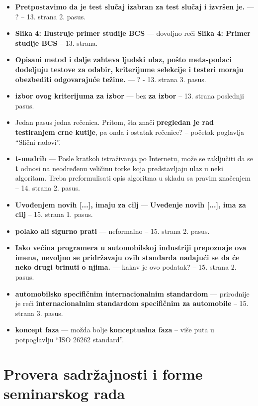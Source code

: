 \documentclass[a4paper]{report}
\begin{document}
\begin{itemize}
\item {\bf{Pretpostavimo da je test slučaj izabran za test slučaj i izvršen je.}} --- ? -- 13. strana 2. pasus.
\item {\bf{Slika 4: Ilustruje primer studije BCS}} --- dovoljno reći {\bf{Slika 4: Primer studije BCS}} -- 13. strana.
\item {\bf{Opisani metod i dalje zahteva ljudski ulaz, pošto meta-podaci dodeljuju testove za odabir, kriterijume selekcije i testeri moraju obezbediti odgovarajuće težine.}} --- ? - 13. strana 3. pasus.
\item {\bf{izbor ovog kriterijuma za izbor}} --- bez {\bf{za izbor}} -- 13. strana poslednji pasus.
\item Jedan pasus jedna rečenica. Pritom, šta znači {\bf{pregledan je rad testiranjem crne kutije}}, pa onda i ostatak rečenice? -- početak poglavlja ``Slični radovi''.
\item {\bf{t-mudrih}} --- Posle kratkoh istraživanja po Internetu, može se zaključiti da se {\bf{t}} odnosi na neodređenu veličinu torke koja predstavljaju ulaz u neki algoritam. Treba preformulisati opis algoritma u skladu sa pravim značenjem -- 14. strana 2. pasus.
\item {\bf{Uvođenjem novih [...], imaju za cilj}} --- {\bf{Uveđenje novih [...], ima za cilj}} -- 15. strana 1. pasus.
\item {\bf{polako ali sigurno prati}} --- neformalno -- 15. strana 2. pasus.
\item {\bf{Iako većina programera u automobilskoj industriji prepoznaje ova imena, nevoljno se pridržavaju ovih standarda nadajući se da će neko drugi brinuti o njima.}} --- kakav je ovo podatak? -- 15. strana 2. pasus.
\item {\bf{automobilsko specifičnim internacionalnim standardom}} --- prirodnije je reći {\bf{internacionalnim standardom specifičnim za automobile}} -- 15. strana 3. pasus.
\item {\bf{koncept faza}} --- možda bolje {\bf{konceptualna faza}} -- više puta u potpoglavlju ``ISO 26262 standard''.
\end{itemize}

\section{Provera sadržajnosti i forme seminarskog rada}
\end{document}
